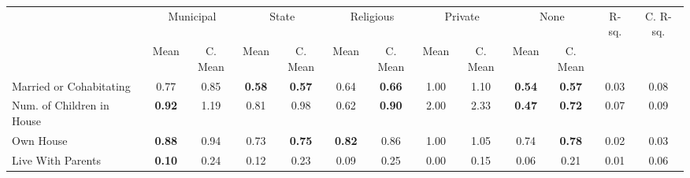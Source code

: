 \begin{tabular}{l c c c c c c c c c c c c}
\toprule
& \multicolumn{2}{c}{Municipal} & \multicolumn{2}{c}{State} & \multicolumn{2}{c}{Religious} & \multicolumn{2}{c}{Private} & \multicolumn{2}{c}{None} & R-sq. & C. R-sq. \\
& \scriptsize Mean & \scriptsize C. Mean & \scriptsize Mean & \scriptsize C. Mean & \scriptsize Mean & \scriptsize C. Mean & \scriptsize Mean & \scriptsize C. Mean & \scriptsize Mean & \scriptsize C. Mean & & \\
\midrule
Married or Cohabitating &      0.77 & 0.85 & \textbf{     0.58} & \textbf{     0.57} &      0.64 & \textbf{     0.66} &      1.00 & 1.10 & \textbf{     0.54} & \textbf{     0.57} &      0.03 &      0.08 \\
Num. of Children in House & \textbf{     0.92} & 1.19 &      0.81 & 0.98 &      0.62 & \textbf{     0.90} &      2.00 & 2.33 & \textbf{     0.47} & \textbf{     0.72} &      0.07 &      0.09 \\
Own House & \textbf{     0.88} & 0.94 &      0.73 & \textbf{     0.75} & \textbf{     0.82} & 0.86 &      1.00 & 1.05 &      0.74 & \textbf{     0.78} &      0.02 &      0.03 \\
Live With Parents & \textbf{     0.10} & 0.24 &      0.12 & 0.23 &      0.09 & 0.25 &      0.00 & 0.15 &      0.06 & 0.21 &      0.01 &      0.06 \\
\bottomrule
\end{tabular}

